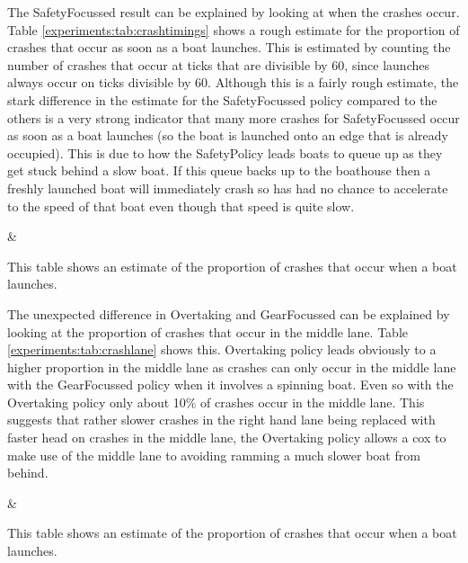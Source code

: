   The SafetyFocussed result can be explained by looking at when the crashes occur. Table \ref{experiments:tab:crashtimings} shows a rough estimate for the proportion of crashes that occur as soon as a boat launches. This is estimated by counting the number of crashes that occur at ticks that are divisible by 60, since launches always occur on ticks divisible by 60. Although this is a fairly rough estimate, the stark difference in the estimate for the SafetyFocussed policy compared to the others is a very strong indicator that many more crashes for SafetyFocussed occur as soon as a boat launches (so the boat is launched onto an edge that is already occupied). This is due to how the SafetyPolicy leads boats to queue up as they get stuck behind a slow boat. If this queue backs up to the boathouse then a freshly launched boat will immediately crash so has had no chance to accelerate to the speed of that boat even though that speed is quite slow.

  \begin{table}[h]
  \centering
  {\cp & \crashes }
  \caption{This table shows an estimate of the proportion of crashes that occur when a boat launches.}
  \label{experiments:tab:crashtimings}
  \end{table}
  
  The unexpected difference in Overtaking and GearFocussed can be explained by looking at the proportion of crashes that occur in the middle lane. Table \ref{experiments:tab:crashlane} shows this. Overtaking policy leads obviously to a higher proportion in the middle lane as crashes can only occur in the middle lane with the GearFocussed policy when it involves a spinning boat. Even so with the Overtaking policy only about 10\% of crashes occur in the middle lane. This suggests that rather slower crashes in the right hand lane being replaced with faster head on crashes in the middle lane, the Overtaking policy allows a cox to make use of the middle lane to avoiding ramming a much slower boat from behind.
  
  \begin{table}[h]
  \centering
  {\cp & \middle }
  \caption{This table shows an estimate of the proportion of crashes that occur when a boat launches.}
  \label{experiments:tab:crashlane}
  \end{table}
  
